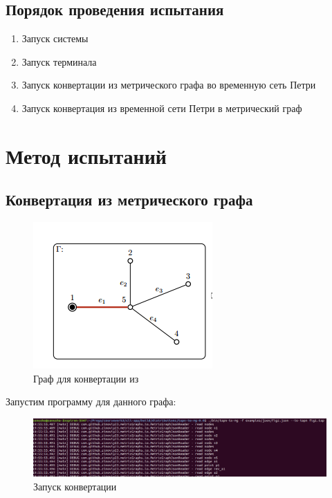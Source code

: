 \documentclass{../TechDoc}
\begin{document}
	\subsection{Порядок проведения испытания}
	\begin{enumerate}
		\item Запуск системы
		\item Запуск терминала
		\item Запуск конвертации из метрического графа во временную сеть Петри
		\item Запуск конвертация из временной сети Петри в метрический граф
	\end{enumerate}

	\section{Метод испытаний}
	\subsection{Конвертация из метрического графа}
	\begin{figure}[h!]
		\centering
		\includegraphics[width=0.7\linewidth]{fig1}
		\caption{Граф для конвертации из \cite{CorMgTapn}}
		\label{fig:fig1}
	\end{figure}
	Запустим программу для данного графа:
	\begin{figure}[h!]
		\centering
		\includegraphics[width=0.7\linewidth]{run_fig1}
		\caption{Запуск конвертации}
		\label{fig:runfig1}
	\end{figure}
	
\end{document}
